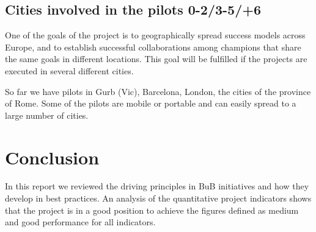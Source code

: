 \documentclass[draftclsnofoot,12pt,journal,onecolumn]{IEEEtran}
\begin{document}
\subsection{Cities  involved in the pilots 0-2/3-5/+6}
One of the goals of the project is to geographically spread success
models across Europe, and to establish successful collaborations among
champions that share the same goals in different locations. This goal
will be fulfilled if the projects are executed in several different
cities.

So far we have pilots in Gurb (Vic), Barcelona, London, the cities of the province of Rome.
Some of the pilots are mobile or portable and can easily spread to a large number of cities.

\section{Conclusion}
\label{sec:conclusion}
In this report we reviewed the driving principles in BuB initiatives and how they develop in best practices.
An analysis of the quantitative project indicators shows that the project is in a good position to achieve the figures defined as medium and good performance for all indicators.





%
\end{document}
